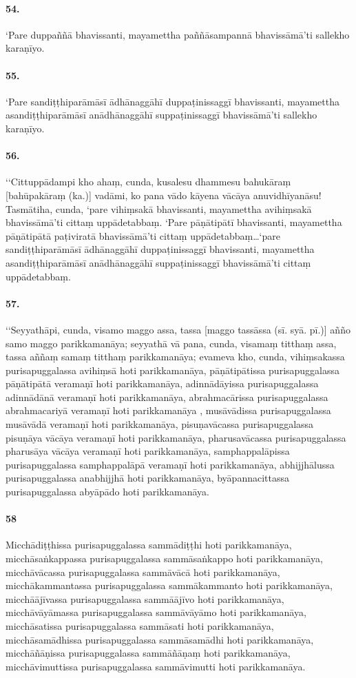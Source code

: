 \paragraph{54.} ‘Pare duppaññā bhavissanti, mayamettha paññāsampannā bhavissāmā’ti sallekho karaṇīyo.

\paragraph{55.} ‘Pare sandiṭṭhiparāmāsī ādhānaggāhī duppaṭinissaggī bhavissanti, mayamettha asandiṭṭhiparāmāsī anādhānaggāhī suppaṭinissaggī bhavissāmā’ti sallekho karaṇīyo.

\paragraph{56.} ‘‘Cittuppādampi kho ahaṃ, cunda, kusalesu dhammesu bahukāraṃ [bahūpakāraṃ (ka.)] vadāmi, ko pana vādo kāyena vācāya anuvidhīyanāsu! Tasmātiha, cunda, ‘pare vihiṃsakā bhavissanti, mayamettha avihiṃsakā bhavissāmā’ti cittaṃ uppādetabbaṃ. ‘Pare pāṇātipātī bhavissanti, mayamettha pāṇātipātā paṭiviratā bhavissāmā’ti cittaṃ uppādetabbaṃ…‘pare sandiṭṭhiparāmāsī ādhānaggāhī duppaṭinissaggī bhavissanti, mayamettha asandiṭṭhiparāmāsī anādhānaggāhī suppaṭinissaggī bhavissāmā’ti cittaṃ uppādetabbaṃ.

\paragraph{57.} ‘‘Seyyathāpi, cunda, visamo maggo assa, tassa [maggo tassāssa (sī. syā. pī.)] añño samo maggo parikkamanāya; seyyathā vā pana, cunda, visamaṃ titthaṃ assa, tassa aññaṃ samaṃ titthaṃ parikkamanāya; evameva kho, cunda, vihiṃsakassa purisapuggalassa avihiṃsā hoti parikkamanāya, pāṇātipātissa purisapuggalassa pāṇātipātā veramaṇī hoti parikkamanāya, adinnādāyissa purisapuggalassa adinnādānā veramaṇī hoti parikkamanāya, abrahmacārissa purisapuggalassa abrahmacariyā veramaṇī hoti parikkamanāya , musāvādissa purisapuggalassa musāvādā veramaṇī hoti parikkamanāya, pisuṇavācassa purisapuggalassa pisuṇāya vācāya veramaṇī hoti parikkamanāya, pharusavācassa purisapuggalassa pharusāya vācāya veramaṇī hoti parikkamanāya, samphappalāpissa purisapuggalassa samphappalāpā veramaṇī hoti parikkamanāya, abhijjhālussa purisapuggalassa anabhijjhā hoti parikkamanāya, byāpannacittassa purisapuggalassa abyāpādo hoti parikkamanāya.

\paragraph{58} Micchādiṭṭhissa purisapuggalassa sammādiṭṭhi hoti parikkamanāya, micchāsaṅkappassa purisapuggalassa sammāsaṅkappo hoti parikkamanāya, micchāvācassa purisapuggalassa sammāvācā hoti parikkamanāya, micchākammantassa purisapuggalassa sammākammanto hoti parikkamanāya, micchāājīvassa purisapuggalassa sammāājīvo hoti parikkamanāya, micchāvāyāmassa purisapuggalassa sammāvāyāmo hoti parikkamanāya, micchāsatissa purisapuggalassa sammāsati hoti parikkamanāya, micchāsamādhissa purisapuggalassa sammāsamādhi hoti parikkamanāya, micchāñāṇissa purisapuggalassa sammāñāṇaṃ hoti parikkamanāya, micchāvimuttissa purisapuggalassa sammāvimutti hoti parikkamanāya.

